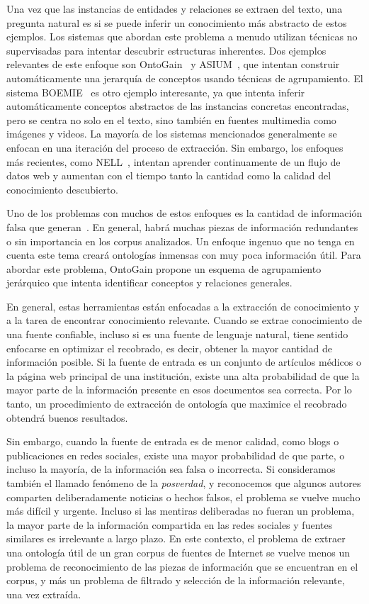 Una vez que las instancias de entidades y relaciones se extraen del texto, una pregunta natural es si se puede inferir un conocimiento más abstracto de estos ejemplos.
Los sistemas que abordan este problema a menudo utilizan técnicas no supervisadas para intentar descubrir estructuras inherentes.
Dos ejemplos relevantes de este enfoque son OntoGain~\cite{drymonas2010unsupervised} y ASIUM~\cite{asium}, que intentan construir automáticamente una jerarquía de conceptos usando técnicas de agrupamiento.
El sistema BOEMIE~\cite{boemie} es otro ejemplo interesante, ya que intenta inferir automáticamente conceptos abstractos de las instancias concretas encontradas, pero se centra no solo en el texto, sino también en fuentes multimedia como imágenes y videos.
La mayoría de los sistemas mencionados generalmente se enfocan en una iteración del proceso de extracción.
Sin embargo, los enfoques más recientes, como NELL~\cite{mitchell2015never}, intentan aprender continuamente de un flujo de datos web y aumentan con el tiempo tanto la cantidad como la calidad del conocimiento descubierto.

Uno de los problemas con muchos de estos enfoques es la cantidad de información falsa que generan~\cite{Maimon:2015:OLT:2870689.2870690}.
En general, habrá muchas piezas de información redundantes o sin importancia en los corpus analizados.
Un enfoque ingenuo que no tenga en cuenta este tema creará ontologías inmensas con muy poca información útil.
Para abordar este problema, OntoGain propone un esquema de agrupamiento jerárquico que intenta identificar conceptos y relaciones generales.

En general, estas herramientas están enfocadas a la extracción de conocimiento y a la tarea de encontrar conocimiento relevante.
Cuando se extrae conocimiento de una fuente confiable, incluso si es una fuente de lenguaje natural, tiene sentido enfocarse en optimizar el recobrado, es decir, obtener la mayor cantidad de información posible.
Si la fuente de entrada es un conjunto de artículos médicos o la página web principal de una institución, existe una alta probabilidad de que la mayor parte de la información presente en esos documentos sea correcta.
Por lo tanto, un procedimiento de extracción de ontología que maximice el recobrado obtendrá buenos resultados.

Sin embargo, cuando la fuente de entrada es de menor calidad, como blogs o publicaciones en redes sociales, existe una mayor probabilidad de que parte, o incluso la mayoría, de la información sea falsa o incorrecta.
Si consideramos también el llamado fenómeno de la \textit{posverdad}, y reconocemos que algunos autores comparten deliberadamente noticias o hechos falsos, el problema se vuelve mucho más difícil y urgente.
Incluso si las mentiras deliberadas no fueran un problema, la mayor parte de la información compartida en las redes sociales y fuentes similares es irrelevante a largo plazo.
En este contexto, el problema de extraer una ontología útil de un gran corpus de fuentes de Internet se vuelve menos un problema de reconocimiento de las piezas de información que se encuentran en el corpus, y más un problema de filtrado y selección de la información relevante, una vez extraída.

